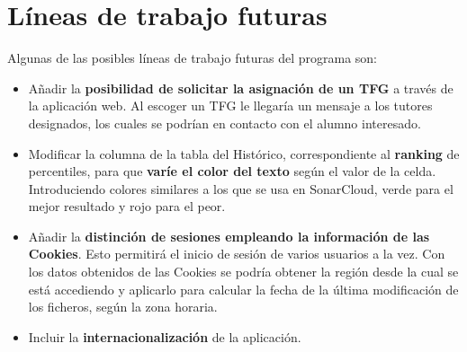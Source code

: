 \section{Líneas de trabajo futuras}
Algunas de las posibles líneas de trabajo futuras del programa son:
\begin{itemize}
	\item Añadir la \textbf{posibilidad de solicitar la asignación de un TFG} a través de la aplicación web. Al escoger un TFG le llegaría un mensaje a los tutores designados, los cuales se podrían en contacto con el alumno interesado. 
	\item Modificar la columna de la tabla del Histórico, correspondiente al \textbf{ranking} de percentiles, para que \textbf{varíe el color del texto} según el valor de la celda. Introduciendo colores similares a los que se usa en SonarCloud, verde para el mejor resultado y rojo para el peor.
	\item Añadir la \textbf{distinción de sesiones empleando la información de las Cookies}. Esto permitirá el inicio de sesión de varios usuarios a la vez. Con los datos obtenidos de las Cookies se podría obtener la región desde la cual se está accediendo y aplicarlo para calcular la fecha de la última modificación de los ficheros, según la zona horaria.
	\item Incluir la \textbf{internacionalización} de la aplicación.
\end{itemize}